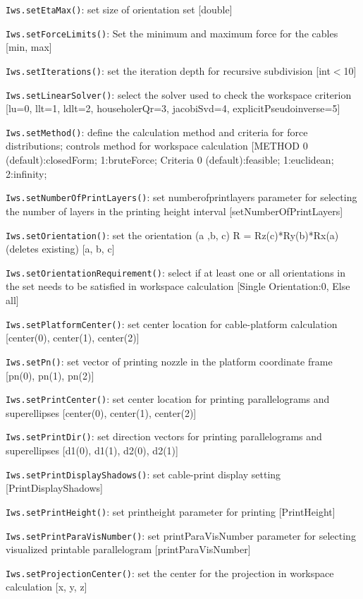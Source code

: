 \documentclass[11pt,a4paper,onepage,openany]{book}
\begin{document}
\texttt{Iws.setEtaMax()}: set size of orientation set [double]

\texttt{Iws.setForceLimits()}: Set the minimum and maximum force for the cables [min, max]

\texttt{Iws.setIterations()}: set the iteration depth for recursive subdivision [int$<$10]

\texttt{Iws.setLinearSolver()}: select the solver used to check the workspace criterion [lu=0, llt=1, ldlt=2, householerQr=3, jacobiSvd=4, explicitPseudoinverse=5]

\texttt{Iws.setMethod()}: define the calculation method and criteria for force distributions; controls method for workspace calculation [METHOD 0 (default):closedForm; 1:bruteForce; Criteria 0 (default):feasible; 1:euclidean; 2:infinity;

\texttt{Iws.setNumberOfPrintLayers()}: set numberofprintlayers parameter for selecting the number of layers in the printing height interval [setNumberOfPrintLayers]

\texttt{Iws.setOrientation()}: set the orientation (a ,b, c) R = Rz(c)*Ry(b)*Rx(a) (deletes existing) [a, b, c]

\texttt{Iws.setOrientationRequirement()}: select if at least one or all orientations in the set needs to be satisfied in workspace calculation [Single Orientation:0, Else all]

\texttt{Iws.setPlatformCenter()}: set center location for cable-platform calculation [center(0), center(1), center(2)]

\texttt{Iws.setPn()}: set vector of printing nozzle in the platform coordinate frame [pn(0), pn(1), pn(2)]

\texttt{Iws.setPrintCenter()}: set center location for printing parallelograms and superellipses [center(0), center(1), center(2)]

\texttt{Iws.setPrintDir()}: set direction vectors for printing parallelograms and superellipses [d1(0), d1(1), d2(0), d2(1)]

\texttt{Iws.setPrintDisplayShadows()}: set cable-print display setting [PrintDisplayShadows]

\texttt{Iws.setPrintHeight()}: set printheight parameter for printing [PrintHeight]

\texttt{Iws.setPrintParaVisNumber()}: set printParaVisNumber parameter for selecting visualized printable parallelogram [printParaVisNumber]

\texttt{Iws.setProjectionCenter()}: set the center for the projection in workspace calculation [x, y, z]
\end{document}
